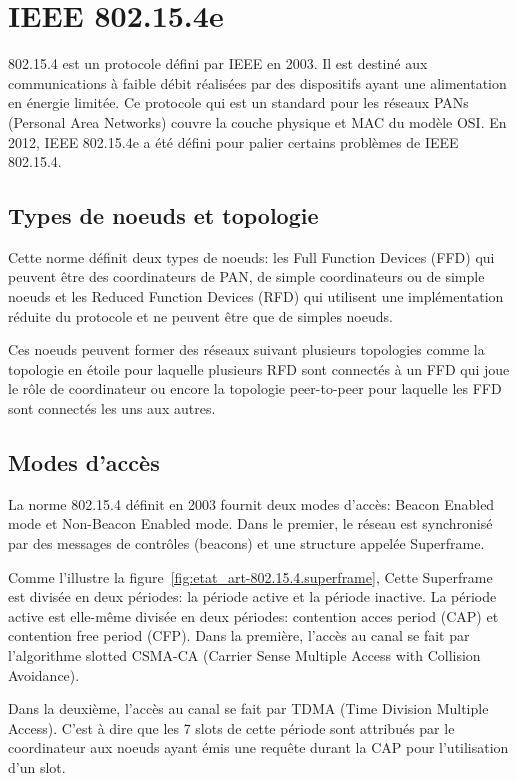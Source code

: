 \section{IEEE 802.15.4e}\label{sec:etat_art-802.15.4}
\renewcommand{\rightmark}{IEEE 802.15.4e}
    802.15.4 est un protocole défini par IEEE en 2003. Il est destiné aux communications à faible débit réalisées par des dispositifs ayant une alimentation en énergie limitée.
    Ce protocole qui est un standard pour les réseaux PANs (Personal Area Networks) couvre la couche physique et MAC du modèle OSI. En 2012, IEEE 802.15.4e a été défini pour palier certains problèmes de IEEE 802.15.4.

  \subsection*{Types de noeuds et topologie}
    Cette norme définit deux types de noeuds: les Full Function Devices (FFD) qui peuvent être des coordinateurs de PAN, de simple coordinateurs ou de simple noeuds et les Reduced Function Devices (RFD) qui utilisent une implémentation réduite du protocole et ne peuvent être que de simples noeuds.

    Ces noeuds peuvent former des réseaux suivant plusieurs topologies
    comme la topologie en étoile pour laquelle plusieurs RFD sont connectés à un FFD qui
    joue le rôle de coordinateur ou encore la topologie peer-to-peer pour laquelle les FFD sont connectés les uns aux autres.

  \subsection*{Modes d'accès}
    La norme 802.15.4 définit en 2003 fournit deux modes d'accès: Beacon Enabled mode et Non-Beacon Enabled mode.
    Dans le premier, le réseau est synchronisé par des messages de contrôles (beacons)
    et une structure appelée Superframe.

    Comme l'illustre la figure~\ref{fig:etat_art-802.15.4.superframe}, Cette Superframe est divisée en deux périodes: la période active et la période inactive. La période active est elle-même divisée en deux périodes: contention acces period (CAP) et contention free period (CFP). Dans la première, l'accès au canal se fait par l'algorithme slotted CSMA-CA (Carrier Sense Multiple Access with Collision Avoidance).
    
    Dans la deuxième, l'accès au canal se fait par TDMA (Time Division Multiple Access). C'est à dire que les 7 slots de cette période sont attribués par le coordinateur aux noeuds ayant émis une requête durant la CAP pour l'utilisation d'un slot.

